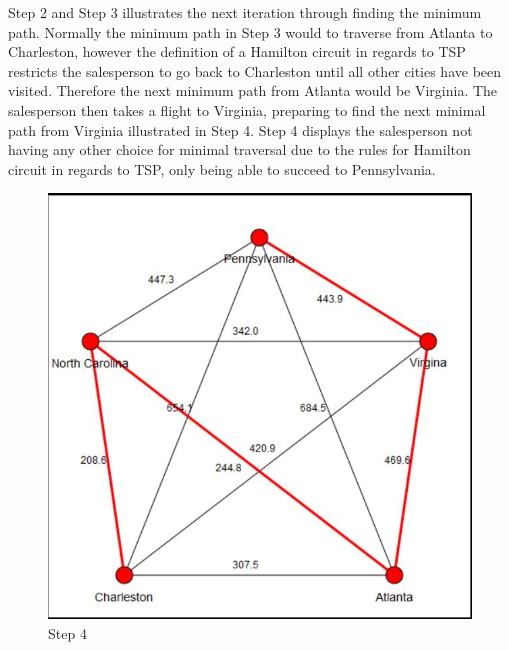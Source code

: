\documentclass[a4paper,11pt]{scrartcl}
\begin{document}
Step 2 and Step 3 illustrates the next iteration through finding the minimum path. Normally the minimum path in Step 3 would to traverse from Atlanta to Charleston, however the definition of a Hamilton circuit in regards to TSP restricts the salesperson to go back to Charleston until all other cities have been visited. Therefore the next minimum path from Atlanta would be Virginia. The salesperson then takes a flight to Virginia, preparing to find the next minimal path from Virginia illustrated in Step 4. Step 4  displays the salesperson not having any other choice for minimal traversal due to the rules for Hamilton circuit in regards to TSP, only being able to succeed to Pennsylvania.

\begin{figure}[!h]
  \centering
  \begin{minipage}[b]{0.4\textwidth}
    \includegraphics[width=\textwidth]{Step4}
    \caption{Step 4}
  \end{minipage}
  \hfill
  \begin{minipage}[b]{0.4\textwidth}

\end{minipage}
\end{figure}
\end{document}
